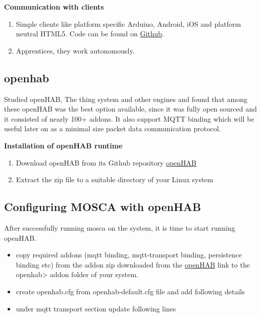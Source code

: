 \documentclass[16pt]{article}
\begin{document}
\vspace{0.5cm}

{\Large{\textbf{Communication with
clients}}}


\begin{enumerate}


\item
  Simple clients like platform specific Arduino, Android, iOS and
  platform neutral HTML5. Code can be found on
  {\color{red}\href{https://github.com/TheThingSystem/steward/tree/master/clients/examples}{Github}}.
\item
  Apprentices, they work autonomously.
  
\end{enumerate}

\subsection{openhab}


Studied openHAB, The thing system and other engines and found that among these openHAB was the best option available, since it was fully open sourced and it
consisted of nearly 100+ addons. It also support MQTT binding which will be useful later on as a minimal size packet data communication protocol.

\hfill

\textbf{Installation of openHAB runtime}

\begin{enumerate}

  \item Download openHAB from its Github repository {\color{red}\href{https://github.com/openhab}{openHAB}}
  \item Extract the zip file to a suitable directory of your Linux system

\end{enumerate}



\subsection{Configuring MOSCA with
openHAB}



After successfully running mosca on the system, it is time to start
running openHAB.

\begin{itemize}

\item
  copy required addons (mqtt binding, mqtt-transport binding,
  persistence binding etc) from the addon zip downloaded from the
  {\color{red}\href{https://bintray.com/artifact/download/openhab/bin/distribution-1.7.0-addons.zip}{openHAB}}
  link to the openhab\textgreater{} addon folder of your system.
\item
  create openhab.cfg from openhab-default.cfg file and add following
  details
\item
  under mqtt transport section update following lines
\end{itemize}
\end{document}
